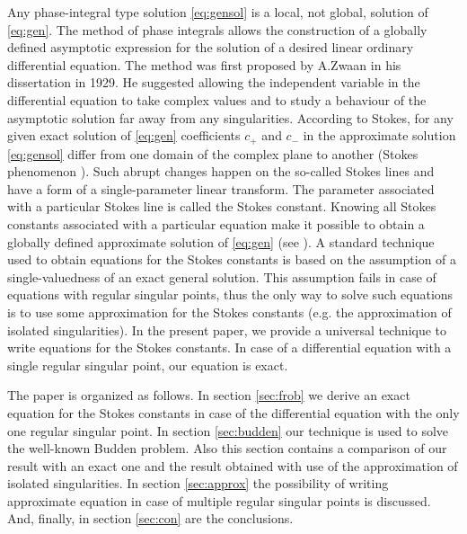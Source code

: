 \documentclass[aip,jmp,reprint]{revtex4-1}
\begin{document}
Any phase-integral type solution \eqref{eq:gensol} is a local, not global, solution of \eqref{eq:gen}. 
The method of phase integrals allows the construction of a globally defined 
asymptotic expression for the solution of a desired linear ordinary differential 
equation. The method was first proposed by A.Zwaan\cite{zwaan} in his dissertation in 1929. 
He suggested allowing the independent variable in the differential equation to take 
complex values and to study a behaviour of the asymptotic solution far away from any 
singularities. According to Stokes\cite{stokes}, for any given exact solution 
of \eqref{eq:gen} coefficients $c_+$ and $c_-$ in the approximate solution \eqref{eq:gensol} 
differ from one domain of the complex plane to another 
(Stokes phenomenon \cite{stokes,rwbook,heading,frbook}). Such abrupt 
changes happen on the so-called Stokes lines and have a form of a single-parameter 
linear transform\cite{heading}. The parameter associated with a particular Stokes line 
is called the Stokes constant. Knowing all Stokes constants associated with a particular 
equation make it possible to obtain a globally defined approximate solution 
of \eqref{eq:gen} (see ). A standard technique\cite{frpaper} used to obtain
equations for the Stokes constants is based on the assumption of a single-valuedness of
an exact general solution. This assumption fails in case of equations with regular singular points\cite{cbbook}, thus
the only way to solve such equations is to use some approximation for the Stokes constants\cite{rwbook, ours}
(e.g. the approximation of isolated singularities\cite{rwbook}). In the present paper, we provide a universal
technique to write equations for the Stokes constants. In case of a differential equation with
a single regular singular point, our equation is exact.

The paper is organized as follows.
In section \ref{sec:frob} we derive an exact equation for the Stokes constants in case of the differential
equation with the only one regular singular point. 
In section \ref{sec:budden} our technique is used to solve the well-known Budden problem. Also this
section contains a comparison of our result with an exact one and the result obtained with use
of the approximation of isolated singularities.
In section \ref{sec:approx} the possibility of writing approximate equation in case of multiple 
regular singular points is discussed.
And, finally, in section \ref{sec:con} are the conclusions. 
\end{document}
